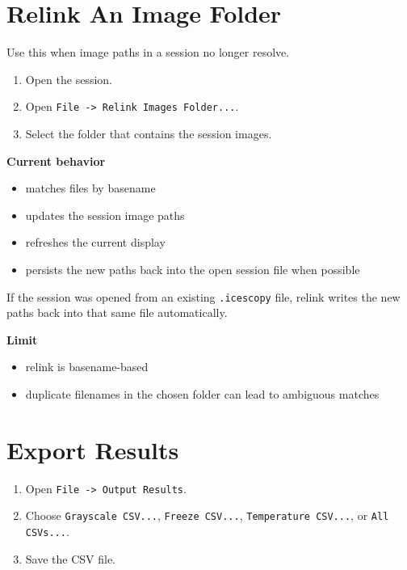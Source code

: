 \documentclass[
  9pt,
  letterpaper,
  oneside,
  open=any,
  DIV=15,
  parskip=half-,
  headings=big,
  numbers=noenddot
]{scrbook}
\newcommand{\manuallead}[1]{%
  \vspace{0.15em}%
  {\sffamily\bfseries\color{ManualBlue}#1}\par\nobreak\vspace{0.05em}%
}
\begin{document}
\section{Relink An Image Folder}

Use this when image paths in a session no longer resolve.


\begin{enumerate}[leftmargin=*,itemsep=0.35em,topsep=0.4em]
\item Open the session.
\item Open \texttt{File -> Relink Images Folder...}.
\item Select the folder that contains the session images.
\end{enumerate}

\manuallead{Current behavior}

\begin{itemize}[leftmargin=*,itemsep=0.35em,topsep=0.4em]
\item matches files by basename
\item updates the session image paths
\item refreshes the current display
\item persists the new paths back into the open session file when possible
\end{itemize}

If the session was opened from an existing \texttt{.icescopy} file, relink writes the new paths back into that same file automatically.


\manuallead{Limit}

\begin{itemize}[leftmargin=*,itemsep=0.35em,topsep=0.4em]
\item relink is basename-based
\item duplicate filenames in the chosen folder can lead to ambiguous matches
\end{itemize}

\section{Export Results}

\begin{enumerate}[leftmargin=*,itemsep=0.35em,topsep=0.4em]
\item Open \texttt{File -> Output Results}.
\item Choose \texttt{Grayscale CSV...}, \texttt{Freeze CSV...}, \texttt{Temperature CSV...}, or \texttt{All CSVs...}.
\item Save the CSV file.
\end{enumerate}
\end{document}
